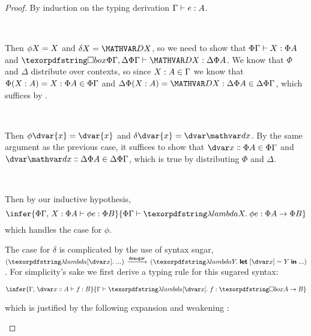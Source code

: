 \begin{proof}\label{proof-phi-delta-well-typed}
  By induction on the typing derivation ${\Gamma} \vdash {e} \mathrel{:} {A}$.

  \begin{description}[topsep=1em,itemsep=1em]
    \item[Case\quad $\infer{\hm x A \in \G}{\J {\mvar x} \G A}$,\quad $\phi\mvar{x} =
      \mvar{x}$,\quad $\delta\mvar{x} = \mvar\dx$.]\

      Then $\phi \mvar x = \mvar{x}$ and $\delta\mvar x = \mvar\dx$, so we
      need to show that $\J{\mvar{x}}{\Phi\Gamma}{\Phi A}$ and
      $\J{\mvar\dx}{\iso\Phi\Gamma, \Delta\Phi\Gamma}{\Delta\Phi A}$. We know
      that $\Phi$ and $\Delta$ distribute over contexts, so since $\hm x A \in
      \Gamma$ we know that $\Phi(\hm x A) = \hm x {\Phi A} \in \Phi\Gamma$ and
      $\Delta\Phi(\hm x A) = \hm{\dx}{\Delta\Phi A} \in \Delta\Phi\Gamma$, which
      suffices by .

    \item[Case\quad $\infer{\hd x A \in \G}{\J {\dvar x} \G A}$,\quad
      $\phi\dvar{x} = \dvar{x}$,\quad $\delta\dvar{x} = \dvar\dx$.]\

      Then $\phi\dvar{x} = \dvar{x}$ and $\delta\dvar{x} = \dvar\dx$. By the
      same argument as the previous case, it suffices to show that $\hd{x}{\Phi
        A} \in \Phi\Gamma$ and $\hd{\dx}{\Delta\Phi A} \in \Delta\Phi\Gamma$,
      which is true by distributing $\Phi$ and $\Delta$.

    \item[Case\quad $\infer{\J e {\G,\,\hm x A} B}{\J {\efn x e} \G {A \to B}}$,\quad
      $\phi(\efn x e) = \efn x \phi e$,\quad
      $\delta(\efn x e) = \fnof{\pboxvar x}\efn\dx \delta e$.]\

      Then by our inductive hypothesis,
      \[
      \infer{
        \J{\phi e}{\Phi\Gamma,\, \hm x {\Phi A}}{\Phi B}
      }{\J{\efn x \phi e}{\Phi\Gamma}{\Phi A \to \Phi B}}
      \]
      which handles the case for $\phi$.

      The case for $\delta$ is complicated by the use of syntax sugar,
      $(\fnof{\pboxvar x} ...) \desugars (\efn y \eletbox x {\mvar y} ...)$. For
      simplicity's sake we first derive a typing rule for this sugared syntax:

      \[
      \infer{
        \J{f}{\Gamma,\, \hd x A}{B}
      }{
        \J{\fnof{\pboxvar x} f}{\Gamma}{\iso A \to B}
      }
      \]

      \noindent
      which is justified by the following expansion and weakening
      :


\end{description}
\end{proof}
